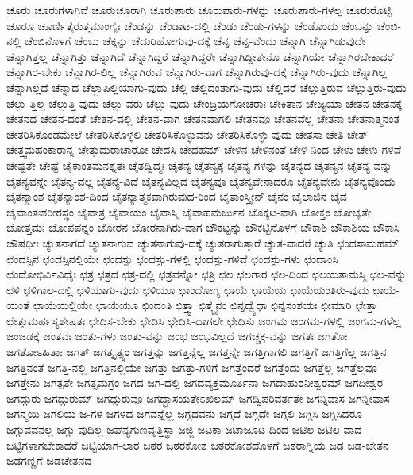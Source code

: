 {ಚೂರು
ಚೂರುಗಳಾಗಿವೆ
ಚೂರುಚೂರಾಗಿ
ಚೂರುಪಾರು
ಚೂರುಪಾರು-ಗಳನ್ನು
ಚೂರುಪಾರು-ಗಳಲ್ಲ
ಚೂರುರೊಟ್ಟಿ
ಚೂರೂ
ಚೂರ್ಣಿತೈರುತ್ತಮಾಂಗೈಃ
ಚೆಂಡನ್ನು
ಚೆಂಡಾಟ-ದಲ್ಲಿ
ಚೆಂಡು
ಚೆಂಡು-ಗಳನ್ನು
ಚೆಂಡೊಂದು
ಚೆಂಬನ್ನು
ಚೆಂಬಿ-ನಲ್ಲಿ
ಚೆಂಬಿನೊಳಗೆ
ಚೆಂಬು
ಚೆಕ್ಕನ್ನು
ಚೆದುರಿಹೋಗುವು-ದಕ್ಕೆ
ಚೆನ್ನ
ಚೆನ್ನ-ವೆಂದು
ಚೆನ್ನಾಗಿ
ಚೆನ್ನಾಗಿಡುವುದೇ
ಚೆನ್ನಾಗಿತ್ತಲ್ಲ
ಚೆನ್ನಾಗಿತ್ತು
ಚೆನ್ನಾಗಿದೆ
ಚೆನ್ನಾಗಿದ್ದರೆ
ಚೆನ್ನಾಗಿದ್ದರೇ
ಚೆನ್ನಾಗಿದ್ದೀತೇನೊ
ಚೆನ್ನಾಗಿಯೇ
ಚೆನ್ನಾಗಿರಬೇಕಾದರೆ
ಚೆನ್ನಾಗಿರ-ಬೇಕು
ಚೆನ್ನಾಗಿರ-ಲಿಲ್ಲ
ಚೆನ್ನಾಗಿರುವ
ಚೆನ್ನಾಗಿರು-ವಾಗ
ಚೆನ್ನಾಗಿರುವು-ದಕ್ಕೆ
ಚೆನ್ನಾಗಿರು-ವುದು
ಚೆನ್ನಾಗಿಲ್ಲ
ಚೆನ್ನಾಗಿಲ್ಲದೆ
ಚೆನ್ನಾದ
ಚೆಲ್ಲಾಪಿಲ್ಲಿಯಾಗು-ವುದು
ಚೆಲ್ಲಿ
ಚೆಲ್ಲಿದಂತಾಗು-ವುದು
ಚೆಲ್ಲಿದರೆ
ಚೆಲ್ಲುತ್ತಿರುವ
ಚೆಲ್ಲುತ್ತಿರು-ವುದು
ಚೆಲ್ಲು-ತ್ತಿಲ್ಲ
ಚೆಲ್ಲುತ್ತಿ-ವುದು
ಚೆಲ್ಲು-ವರು
ಚೆಲ್ಲು-ವುದು
ಚೇಂದ್ರಿಯಗೋಚರಾಃ
ಚೇಕಿತಾನ
ಚೇಜ್ಯಯಾ
ಚೇತನ
ಚೇತನಕ್ಕೆ
ಚೇತನದ
ಚೇತನ-ದಂತೆ
ಚೇತನ-ದಲ್ಲಿ
ಚೇತನ-ವಾಗ
ಚೇತನವಾಗಲಿ
ಚೇತನವೂ
ಚೇತನವೆಲ್ಲ
ಚೇತನಾ
ಚೇತನಾತ್ಮನಂತೆ
ಚೇತರಿಸಿಕೊಂಡಮೇಲೆ
ಚೇತರಿಸಿಕೊಳ್ಳಲಿ
ಚೇತರಿಸಿಕೊಳ್ಳುವನು
ಚೇತರಿಸಿಕೊಳ್ಳು-ವುದು
ಚೇತಸಾ
ಚೇತಿ
ಚೇತ್
ಚೇತ್ತ್ವಮಹಂಕಾರಾನ್ನ
ಚೇತ್ಸುದುರಾಚಾರೋ
ಚೇದಸಿ
ಚೇದಹಮ್
ಚೇಳಿನ
ಚೇಳಿನಂತೆ
ಚೇಳಿ-ನಿಂದ
ಚೇಳು
ಚೇಳು-ಗಳಿವೆ
ಚೇಷ್ಟತೇ
ಚೇಷ್ಟೆ
ಚೈಕಾಂತಮನಶ್ನತಃ
ಚೈತದ್ವಿದ್ಮಃ
ಚೈತನ್ಯ
ಚೈತನ್ಯಕ್ಕೆ
ಚೈತನ್ಯ-ಗಳನ್ನು
ಚೈತನ್ಯದ
ಚೈತನ್ಯನ
ಚೈತನ್ಯ-ವನ್ನು
ಚೈತನ್ಯವನ್ನೇ
ಚೈತನ್ಯ-ವಲ್ಲ
ಚೈತನ್ಯ-ವಿದೆ
ಚೈತನ್ಯವಿಲ್ಲದ
ಚೈತನ್ಯವೂ
ಚೈತನ್ಯವೇನಾದರೂ
ಚೈತನ್ಯವೇನು
ಚೈತನ್ಯವೊಂದು
ಚೈತನ್ಯಾಂಶ
ಚೈತನ್ಯಾಂಶ-ದಿಂದ
ಚೈತನ್ಯಾತ್ಮಕವಾಗಿರುವುದ-ರಿಂದ
ಚೈತಾಂಸ್ತ್ರೀನ್
ಚೈನಂ
ಚೈಲಾಜಿನ
ಚೈವ
ಚೈವಾಂತಃಶರೀರಸ್ಥಂ
ಚೈವಾತ್ರ
ಚೈವಾಯಂ
ಚೈವಾಸ್ಮಿ
ಚೈವಾಹಮರ್ಜುನ
ಚೊಕ್ಕಟ-ವಾಗಿ
ಚೋಕ್ತಂ
ಚೋಚ್ಯತೇ
ಚೋತ್ತಮಃ
ಚೋಪಪನ್ನಂ
ಚೋರನ
ಚೋರನಾಗಿರು-ವಾಗ
ಚೌಕಟ್ಟನ್ನು
ಚೌಕಟ್ಟಿನೊಳಗೆ
ಚೌಕಾಶಿ
ಚೌಕಾಶಿಯ
ಚೌಕಾಸಿ
ಚೌಷಧೀಃ
ಚ್ಯುತನಾಗದೆ
ಚ್ಯುತನಾಗುವ
ಚ್ಯುತನಾಗುವು-ದಕ್ಕೆ
ಚ್ಯುತರಾಗುತ್ತಾರೆ
ಚ್ಯುತ-ವಾದರೆ
ಚ್ಯುತಿ
ಛಂದಸಾಮಹಮ್
ಛಂದಸ್ಸಿನ
ಛಂದಸ್ಸಿನಲ್ಲಿಯೇ
ಛಂದಸ್ಸು
ಛಂದಸ್ಸು-ಗಳಲ್ಲಿ
ಛಂದಸ್ಸು-ಗಳಿವೆ
ಛಂದಸ್ಸು-ಗಳು
ಛಂದಾಂಸಿ
ಛಂದೋಭಿರ್ವಿವಿಧೈಃ
ಛತ್ರ
ಛತ್ರದ
ಛತ್ರ-ದಲ್ಲಿ
ಛತ್ರವನ್ನೋ
ಛತ್ರಿ
ಛಲ
ಛಲಗಾರ
ಛಲ-ದಿಂದ
ಛಲಯತಾಮಸ್ಮಿ
ಛಲ-ವನ್ನು
ಛಳಿ
ಛಳಿಗಾಲ-ದಲ್ಲಿ
ಛಳಿಯಾಗು-ವುದು
ಛಳಿಯೂ
ಛಾಂದೋಗ್ಯ
ಛಾಯೆ
ಛಾಯೆಯ
ಛಾಯೆಯಂತಿರು-ವುದು
ಛಾಯೆ-ಯಂತೆ
ಛಾಯೆಯಲ್ಲಿಯೇ
ಛಾಯೆಯೂ
ಛಿಂದಂತಿ
ಛಿತ್ತ್ವಾ
ಛಿತ್ತ್ವೈನಂ
ಛಿನ್ನದ್ವ್ಯೆಧಾ
ಛಿನ್ನಸಂಶಯಃ
ಛೀಮಾರಿ
ಛೇತ್ತಾ
ಛೇತ್ತುಮರ್ಹಸ್ಯಶೇಷತಃ
ಛೇದಿಸ-ಬೇಕು
ಛೇದಿಸಿ
ಛೇದಿಸಿ-ದಾಗಲೇ
ಛೇದಿಸು
ಜಂಗಮ
ಜಂಗಮ-ಗಳಲ್ಲಿ
ಜಂಗಮ-ಗಳೆಲ್ಲ
ಜಂಜಡಕ್ಕೆ
ಜಂತವಃ
ಜಂತು-ಗಳು
ಜಂತು-ವನ್ನು
ಜಂಭ
ಜಂಭವಿಲ್ಲದೆ
ಜಗಚ್ಚಕ್ರ-ವನ್ನು
ಜಗತಃ
ಜಗತೋ
ಜಗತೋಽಹಿತಾಃ
ಜಗತ್
ಜಗತ್ಕೃತ್ಸ್ನಂ
ಜಗತ್ತನ್ನು
ಜಗತ್ತನ್ನೆಲ್ಲ
ಜಗತ್ತನ್ನೇ
ಜಗತ್ತಿಗಾಗಲಿ
ಜಗತ್ತಿಗೆ
ಜಗತ್ತಿಗೆಲ್ಲ
ಜಗತ್ತಿನ
ಜಗತ್ತಿನಂತೆ
ಜಗತ್ತಿ-ನಲ್ಲಿ
ಜಗತ್ತಿನಲ್ಲಿಯೇ
ಜಗತ್ತು
ಜಗತ್ತು-ಗಳಿಗೆ
ಜಗತ್ತೆಂದರೆ
ಜಗತ್ತೆಂದು
ಜಗತ್ತೆಲ್ಲ
ಜಗತ್ತೆಲ್ಲವೂ
ಜಗತ್ತೇನು
ಜಗತ್ಪತೇ
ಜಗತ್ಸಮಗ್ರಂ
ಜಗದ
ಜಗ-ದಲ್ಲಿ
ಜಗದವ್ಯಕ್ತಮೂರ್ತಿನಾ
ಜಗದಾಹುರನೀಶ್ವರಮ್
ಜಗದೀಶ್ವರ
ಜಗದ್ಗುರು
ಜಗದ್ಗುರುಮ್
ಜಗದ್ಗುರುವೂ
ಜಗದ್ಭಾಸಯತೇಽಖಿಲಮ್
ಜಗದ್ವಿಪರಿವರ್ತತೇ
ಜಗನ್ನಿವಾಸ
ಜಗನ್ನೀವಾಸ
ಜಗನ್ಮಯಿ
ಜಗಲಿಯ
ಜ-ಗಳ
ಜಗಳದ
ಜಗವನ್ನೆಲ್ಲ
ಜಗ್ಗದವನು
ಜಗ್ಗದೆ
ಜಗ್ಗದೇ
ಜಗ್ಗಲಿ
ಜಗ್ಗಿಸಿ
ಜಗ್ಗಿಸಿದರೂ
ಜಗ್ಗುವವನಲ್ಲ
ಜಗ್ಗು-ವುದಿಲ್ಲ
ಜಘನ್ಯಗುಣವೃತ್ತಿಸ್ಥಾ
ಜಜ್ಜಿ
ಜಟಕಾ
ಜಟಾಜೂಟ-ದಿಂದ
ಜಟಿಲ
ಜಟಿಲ-ವಾದ
ಜಟ್ಟಿಗಳಾಗಬೇಕಾದರೆ
ಜಟ್ಟಿಯಾಗ-ಲಾರ
ಜಠರ
ಜಠರಕೋಶ
ಜಠರಕೋಶದೊಳಗೆ
ಜಠರಾಗ್ನಿಯ
ಜಡ
ಜಡ-ಚೇತನ
ಜಡಗಣ್ಣಿಗೆ
ಜಡಚೇತನದ
}
